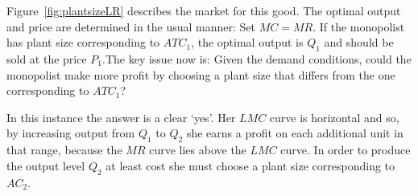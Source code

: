 \newhtmlpage

Figure~\ref{fig:plantsizeLR} describes the market for this good. The optimal
output and price are determined in the usual manner: Set $MC=MR$. If the
monopolist has plant size corresponding to $ATC_1$, the optimal output is 
$Q_1$ and should be sold at the price $P_1$.The key issue now is: Given the
demand conditions, could the monopolist make more profit by choosing a plant
size that differs from the one corresponding to $ATC_1$?



In this instance the answer is a clear `yes'. Her $LMC$ curve is horizontal
and so, by increasing output from $Q_1$ to $Q_2$ she earns a profit on each
additional unit in that range, because the $MR$ curve lies above the $LMC$
curve. In order to produce the output level $Q_2$ at least cost she must
choose a plant size corresponding to $AC_2$.
